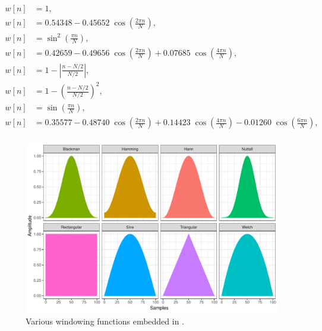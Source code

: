 \documentclass[a4paper,9pt]{extarticle}
\newcommand*{\method}[1]{\text{#1}\xspace}
\newcommand*{\smashpp}   {\method{Smash++}}
\begin{document}
\begin{align}
  w[n] & = 1,
  \tag*{\small(rectangular)} \\
  w[n] & = 0.54348-0.45652\;\cos \left(\tfrac {2\pi n}{N}\right),
  \tag*{\small(Hamming)} \\
  w[n] & = \sin^2 \left(\tfrac {\pi n}{N}\right),
  \tag*{\small(Hann)} \\
  w[n] & = 0.42659-0.49656\;\cos \left(\tfrac {2\pi n}{N}\right)+0.07685\;\cos \left(\tfrac {4\pi n}{N}\right),
  \tag*{\small(Blackman)} \\
  w[n] & = 1-\left|\tfrac {n-N/2}{N/2}\right|,
  \tag*{\small(triangular/Bartlett)} \\
  w[n] & = 1-\left(\tfrac {n-N/2}{N/2}\right)^{2},
  \tag*{\small(Welch)} \\
  w[n] & = \sin \left(\tfrac {\pi n}{N}\right),
  \tag*{\small(sine)} \\
  w[n] & = 0.35577-0.48740\;\cos \left(\tfrac {2\pi n}{N}\right)+0.14423\;\cos \left(\tfrac {4\pi n}{N}\right)-0.01260\;\cos \left(\tfrac {6\pi n}{N}\right),
  \tag*{\small(Nuttall)} \\
  \label{eq.filter}
\end{align}

\begin{figure}[!h]
  \centering
  \includegraphics[width=.9\linewidth]{fig/filters.pdf}
  \caption{Various windowing functions embedded in \smashpp.}
  \label{fig.filters}
\end{figure}
\end{document}
